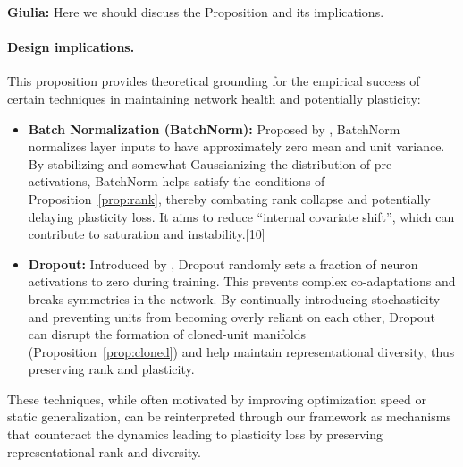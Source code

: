 \documentclass{article}
\newcommand{\giulia}[1]{{\color{ForestGreen}\textbf{Giulia:} #1}}
\begin{document}
\giulia{Here we should discuss the Proposition and its implications. }

\paragraph{Design implications.}
This proposition provides theoretical grounding for the empirical success of certain techniques in maintaining network health and potentially plasticity:
\begin{itemize}
    \item \textbf{Batch Normalization (BatchNorm):} Proposed by \cite{ioffe2015batch}, BatchNorm normalizes layer inputs to have approximately zero mean and unit variance. By stabilizing and somewhat Gaussianizing the distribution of pre-activations, BatchNorm helps satisfy the conditions of Proposition~\ref{prop:rank}, thereby combating rank collapse and potentially delaying plasticity loss. It aims to reduce ``internal covariate shift'', which can contribute to saturation and instability.[10]
    \item \textbf{Dropout:} Introduced by \cite{srivastava2014dropout}, Dropout randomly sets a fraction of neuron activations to zero during training. This prevents complex co-adaptations and breaks symmetries in the network. By continually introducing stochasticity and preventing units from becoming overly reliant on each other, Dropout can disrupt the formation of cloned-unit manifolds (Proposition~\ref{prop:cloned}) and help maintain representational diversity, thus preserving rank and plasticity.
\end{itemize}
These techniques, while often motivated by improving optimization speed or static generalization, can be reinterpreted through our framework as mechanisms that counteract the dynamics leading to plasticity loss by preserving representational rank and diversity.
\end{document}
